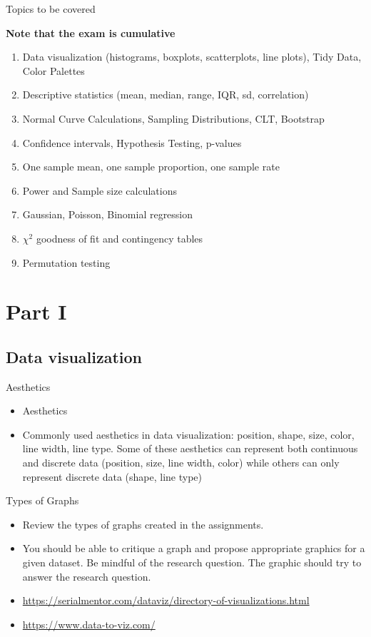 \documentclass[10pt]{beamer}\usepackage[]{graphicx}\usepackage[]{color}
\begin{document}
\begin{frame}{Topics to be covered}
	
	\textbf{Note that the exam is cumulative}
	
	\begin{enumerate}
		\setlength\itemsep{.51em}
		\item Data visualization (histograms, boxplots, scatterplots, line plots), Tidy Data, Color Palettes
		\item Descriptive statistics (mean, median, range, IQR, sd, correlation)
		\item Normal Curve Calculations, Sampling Distributions, CLT, Bootstrap
		\item Confidence intervals, Hypothesis Testing, p-values 
		\item One sample mean, one sample proportion, one sample rate
		\item Power and Sample size calculations
		\item Gaussian, Poisson, Binomial regression
		\item $\chi^2$ goodness of fit and contingency tables
		\item Permutation testing
	\end{enumerate}
	
\end{frame}

\section{Part I}

\subsection{Data visualization}

\begin{frame}{Aesthetics}
	\begin{itemize}
		\setlength\itemsep{.51em}
		\item Aesthetics
		\pause 
		\item Commonly used aesthetics in data visualization: position, shape, size, color, line width, line type. Some of these aesthetics can represent both continuous and discrete data (position, size, line width, color) while others can only represent discrete data (shape, line type)	
	\end{itemize}
\end{frame}

\begin{frame}{Types of Graphs}
	\begin{itemize}
		\item Review the types of graphs created in the assignments.
		\item You should be able to critique a graph and propose appropriate graphics for a given dataset. Be mindful of the research question. The graphic should try to answer the research question. 
		\item \url{https://serialmentor.com/dataviz/directory-of-visualizations.html}
		\item \url{https://www.data-to-viz.com/}
	\end{itemize}
\end{frame}
\end{document}
